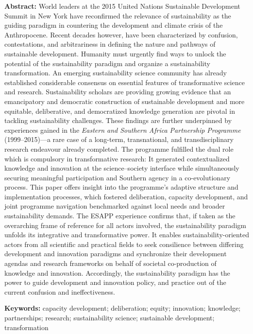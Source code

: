 \documentclass[10pt,a4paper]{article}
\begin{document}
\textbf{{\color{LibrelloColor}Abstract:}} World leaders at the 2015 United Nations Sustainable Development Summit in New York have reconfirmed the relevance of sustainability as the guiding paradigm in countering the development and climate crisis of the Anthropocene. Recent decades however, have been characterized by confusion, contestations, and arbitrariness in defining the nature and pathways of sustainable development. Humanity must urgently find ways to unlock the potential of the sustainability paradigm and organize a sustainability transformation. An emerging sustainability science community has already established considerable consensus on essential features of transformative science and research. Sustainability scholars are providing growing evidence that an emancipatory and democratic construction of sustainable development and more equitable, deliberative, and democratized knowledge generation are pivotal in tackling sustainability challenges. These findings are further underpinned by experiences gained in the \textit{Eastern and Southern Africa Partnership Programme} (1999--2015)---a rare case of a long-term, transnational, and transdisciplinary research endeavour already completed. The programme fulfilled the dual role which is compulsory in transformative research: It generated contextualized knowledge and innovation at the science–society interface while simultaneously securing meaningful participation and Southern agency in a co-evolutionary process. This paper offers insight into the programme’s adaptive structure and implementation processes, which fostered deliberation, capacity development, and joint programme navigation benchmarked against local needs and broader sustainability demands. The ESAPP experience confirms that, if taken as the overarching frame of reference for all actors involved, the sustainability paradigm unfolds its integrative and transformative power. It enables sustainability-oriented actors from all scientific and practical fields to seek consilience between differing development and innovation paradigms and synchronize their development agendas and research frameworks on behalf of societal co-production of knowledge and innovation. Accordingly, the sustainability paradigm has the power to guide development and innovation policy, and practice out of the current confusion and ineffectiveness. 

\textbf{{\color{LibrelloColor}Keywords:}} capacity development; deliberation; equity; innovation; knowledge; partnerships; research; sustainability science; sustainable development; transformation
\par\endgroup
 
\end{document}
